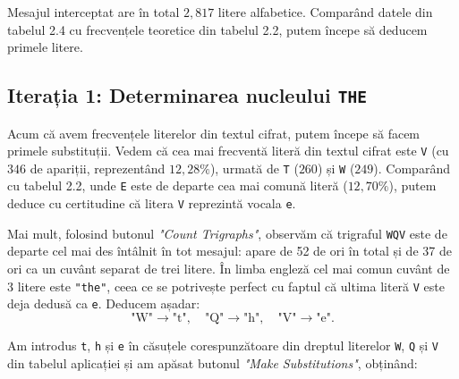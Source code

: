 \documentclass{labreport}
\begin{document}
Mesajul interceptat are în total $2{,}817$ litere alfabetice. Comparând datele din tabelul 2.4 cu frecvențele teoretice din tabelul 2.2, putem începe să deducem primele litere.

\subsection{Iterația 1: Determinarea nucleului \texttt{THE}}

Acum că avem frecvențele literelor din textul cifrat, putem începe să facem primele substituții. Vedem că cea mai frecventă literă din textul cifrat este \texttt{V} (cu $346$ de apariții, reprezentând $12{,}28\%$), urmată de \texttt{T} ($260$) și \texttt{W} ($249$). Comparând cu tabelul 2.2, unde \texttt{E} este de departe cea mai comună literă ($12{,}70\%$), putem deduce cu certitudine că litera \texttt{V} reprezintă vocala \texttt{e}.

Mai mult, folosind butonul \textit{"Count Trigraphs"}, observăm că trigraful \texttt{WQV} este de departe cel mai des întâlnit în tot mesajul: apare de 52 de ori în total și de 37 de ori ca un cuvânt separat de trei litere. În limba engleză cel mai comun cuvânt de 3 litere este \texttt{"the"}, ceea ce se potrivește perfect cu faptul că ultima literă \texttt{V} este deja dedusă ca \texttt{e}. Deducem așadar:
\begin{equation*}
    \text{"W"} \to \text{"t"}, \quad \text{"Q"} \to \text{"h"}, \quad \text{"V"} \to \text{"e"}.
\end{equation*}

Am introdus \texttt{t}, \texttt{h} și \texttt{e} în căsuțele corespunzătoare din dreptul literelor \texttt{W}, \texttt{Q} și \texttt{V} din tabelul aplicației și am apăsat butonul \textit{"Make Substitutions"}, obținând:
\end{document}
